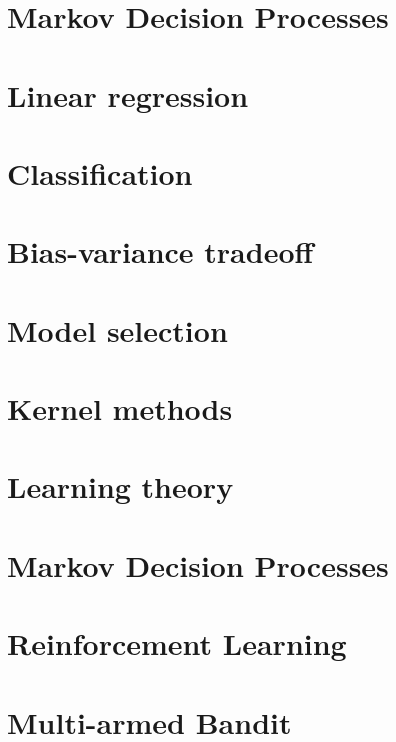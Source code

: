 \documentclass[12pt, a4paper]{report}
\begin{document}
    \chapter{Markov Decision Processes}
    



    \appendix
    \chapter{Linear regression}
    
    
    

    \chapter{Classification}
    
    
    
    
    
    
    

    \chapter{Bias-variance tradeoff}
    
    
    

    \chapter{Model selection}
    
    
    

    \chapter{Kernel methods}
    
    
    

    \chapter{Learning theory}
    
    
    

    \chapter{Markov Decision Processes}
    
    
    

    \chapter{Reinforcement Learning}


    \chapter{Multi-armed Bandit}



    
\end{document}

